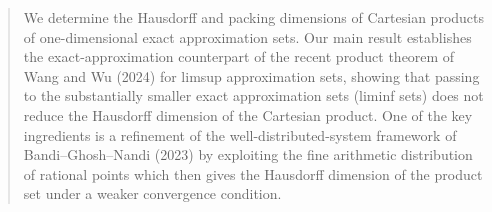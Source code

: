 \documentclass[11pt]{amsart}
\numberwithin{equation}{section}
\newcommand{\0}{\mathbf{0}}
\theoremstyle{remark}
\begin{document}
\begin{abstract}

We determine the Hausdorff and packing dimensions of Cartesian products of one-dimensional exact approximation sets. Our main result establishes the exact-approximation counterpart of the recent product theorem of Wang and Wu (2024) for limsup approximation sets, showing that passing to the substantially smaller exact approximation sets (liminf sets) does not reduce the Hausdorff dimension of the Cartesian product.  
One of the key ingredients is a refinement of the well-distributed-system framework of Bandi--Ghosh--Nandi (2023) by exploiting the fine arithmetic distribution of rational points which then gives the Hausdorff dimension of the product set under a weaker convergence condition. %







\end{abstract}
 \maketitle
\end{document}
